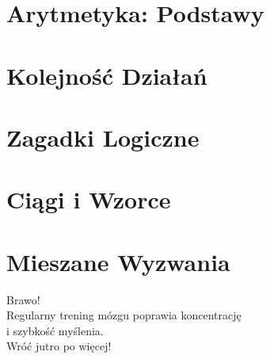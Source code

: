 \documentclass{mybraintrainer}
\begin{document}
\hypertarget{sec1}{}
\section{Arytmetyka: Podstawy}


\hypertarget{sec2}{}
\section{Kolejność Działań}


\hypertarget{sec3}{}
\section{Zagadki Logiczne}


\hypertarget{sec4}{}
\section{Ciągi i Wzorce}


\hypertarget{sec5}{}
\section{Mieszane Wyzwania}


\begin{frame}
  \centering
  {\Huge Brawo!}\\[0.5em]
  Regularny trening mózgu poprawia koncentrację\\[0.3em]
  i szybkość myślenia.\\[1em]
  {\large Wróć jutro po więcej!}
\end{frame}
\end{document}
